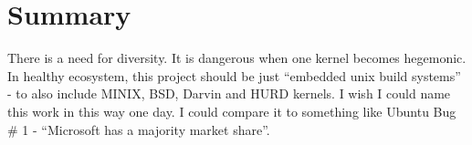 \documentclass[printmode]{mgr}
\begin{document}
\section{Summary}


There is a need for diversity. It is dangerous when one kernel becomes hegemonic. In healthy ecosystem, this project should be just ``embedded unix build systems'' - to also include MINIX, BSD, Darvin and HURD kernels. I wish I could name this work in this way one day. I could compare it to something like Ubuntu Bug \# 1 - ``Microsoft has a majority market share''.\cite{web:ubuntu-bug1}





































\end{document}
